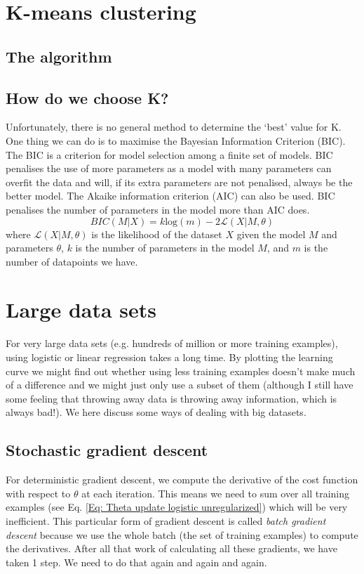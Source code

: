 \documentclass[a4paper, 10pt,hidelinks]{article}
\begin{document}
\section{K-means clustering}

\subsection{The algorithm}


\subsection{How do we choose K?}
Unfortunately, there is no general method to determine the `best' value for K. One thing we can do is to maximise the Bayesian Information Criterion (BIC). The BIC is a criterion for model selection among a finite set of models. BIC penalises the use of more parameters as a model with many parameters can overfit the data and will, if its extra parameters are not penalised, always be the better model. The Akaike information criterion (AIC) can also be used. BIC penalises the number of parameters in the model more than AIC does. 
\begin{equation}
BIC(M | X) = k \text{log}(m)- 2 \mathcal{L}(X|M, \theta)
\end{equation}
where 
$\mathcal{L}(X|M, \theta)$ is the likelihood of the dataset $X$ given the model $M$ and parameters $\theta$, $k$ is the number of parameters in the model $M$, and $m$ is the number of datapoints we have. 

\section{Large data sets}
For very large data sets (e.g. hundreds of million or more training examples), using logistic or linear regression takes a long time. By plotting the learning curve we might find out whether using less training examples doesn't make much of a difference and we might just only use a subset of them (although I still have some feeling that throwing away data is throwing away information, which is always bad!). We here discuss some ways of dealing with big datasets. 

\subsection{Stochastic gradient descent}
For deterministic gradient descent, we compute the derivative of the cost function with respect to $\theta$ at each iteration. This means we need to sum over all training examples (see Eq. \eqref{Eq: Theta update logistic unregularized}) which will be very inefficient. This particular form of gradient descent is called \emph{batch gradient descent} because we use the whole batch (the set of training examples) to compute the derivatives. After all that work of calculating all these gradients, we have taken 1 step. We need to do that again and again and again. 
\end{document}

